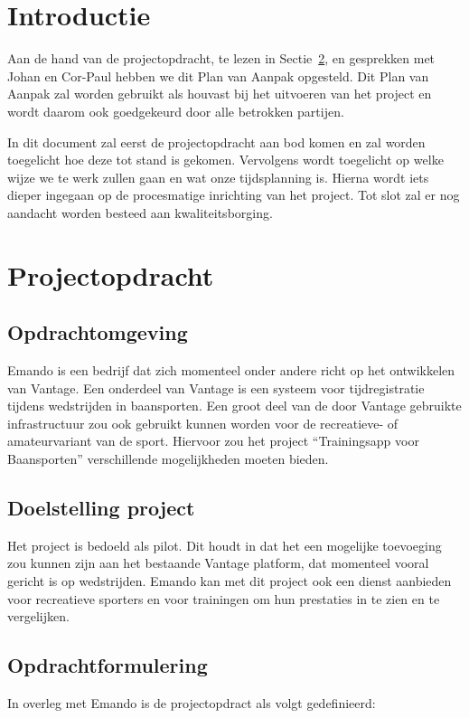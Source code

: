 \section{Introductie}

\ifx\aanleiding\undefined

\fi

Aan de hand van de projectopdracht, te lezen in Sectie~\ref{sec:projectopdracht}, en gesprekken met Johan en Cor-Paul hebben we dit Plan van Aanpak opgesteld. Dit Plan van Aanpak zal worden gebruikt als houvast bij het uitvoeren van het project en wordt daarom ook goedgekeurd door alle betrokken partijen.

In dit document zal eerst de projectopdracht aan bod komen en zal worden toegelicht hoe deze tot stand is gekomen. Vervolgens wordt toegelicht op welke wijze we te werk zullen gaan en wat onze tijdsplanning is. Hierna wordt iets dieper ingegaan op de procesmatige inrichting van het project. Tot slot zal er nog aandacht worden besteed aan kwaliteitsborging.

\section{Projectopdracht}
\label{sec:projectopdracht}
\subsection{Opdrachtomgeving}

Emando is een bedrijf dat zich momenteel onder andere richt op het ontwikkelen van Vantage. Een onderdeel van Vantage is een systeem voor tijdregistratie tijdens wedstrijden in baansporten. Een groot deel van de door Vantage gebruikte infrastructuur zou ook gebruikt kunnen worden voor de recreatieve- of amateurvariant van de sport. Hiervoor zou het project ``Trainingsapp voor Baansporten'' verschillende mogelijkheden moeten bieden.

\subsection{Doelstelling project}
Het project is bedoeld als pilot. Dit houdt in dat het een mogelijke toevoeging zou kunnen zijn aan het bestaande Vantage platform, dat momenteel vooral gericht is op wedstrijden. Emando kan met dit project ook een dienst aanbieden voor recreatieve sporters en voor trainingen om hun prestaties in te zien en te vergelijken.

\subsection{Opdrachtformulering}
In overleg met Emando is de projectopdract als volgt gedefinieerd:

